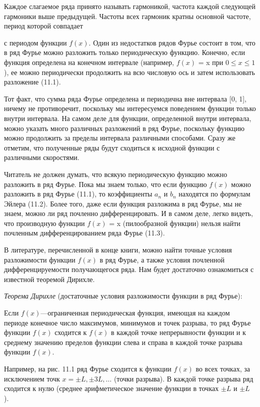 \documentclass[
  ukrainian,
]{article}
\begin{document}
Каждое слагаемое ряда принято называть гармоникой, частота каждой
следующей гармоники выше предыдущей. Частоты всех гармоник кратны
основной частоте, период которой совпадает

с периодом функции \(f(x)\). Один из недостатков рядов Фурье состоит в
том, что в ряд Фурье можно разложить только периодическую функцию.
Конечно, если функция определена на конечном интервале (например,
\(f(x)\) = x при \(0 \le x \le 1\) ), ее можно периодически продолжить
на всю числовую ось и затем использовать разложение (11.1).

Тот факт, что сумма ряда Фурье определена и периодична вне интервала
{[}0, 1{]}, ничему не противоречит, поскольку мы интересуемся поведением
функции только внутри интервала. На самом деле для функции, определенной
внутри интервала, можно указать много различных разложений в ряд Фурье,
поскольку функцию можно продолжить за пределы интервала различными
способами. Сразу же отметим, что полученные ряды будут сходиться к
исходной функции с различными скоростями.

Читатель не должен думать, что всякую периодическую функцию можно
разложить в ряд Фурье. Пока мы знаем только, что если функцию \(f(x)\)
можно разложить в ряд Фурье (11.1), то коэффициенты \(a_n\) и \(b_n\)
находятся по формулам Эйлера (11.2). Более того, даже если функция
разложима в ряд Фурье, мы не знаем, можно ли ряд почленно
дифференцировать. И в самом деле, легко видеть, что производную функции
\(f(x)\) = x (пилообразной функции) нельзя найти почленным
дифференцированием ряда Фурье (11.3).

В литературе, перечисленной в конце книги, можно найти точные условия
разложимости функции \(f(x)\) в ряд Фурье, а также условия почленной
дифференцируемости получающегося ряда. Нам будет достаточно ознакомиться
с известной теоремой Дирихле.

\emph{Теорема Дирихле} (достаточные условия разложимости функции в ряд
Фурье):

Если \(f(x)\)---ограниченная периодическая функция, имеющая на каждом
периоде конечное число максимумов, минимумов и точек разрыва, то ряд
Фурье функции \(f(x)\) сходится к \(f(x)\) в каждой точке непрерывности
функции и к среднему значению пределов функции слева и справа в каждой
точке разрыва функции \(f(x)\).

Например, на рис. 11.1 ряд Фурье сходится к функции \(f(x)\) во всех
точках, за исключением точк \(x=\pm L, \pm 3L, \ldots\) (точки разрыва).
В каждой точке разрыва ряд сходится к нулю (среднее арифметическое
значение функции в точках \(\pm L\) и \(\pm L\) ).
\end{document}
